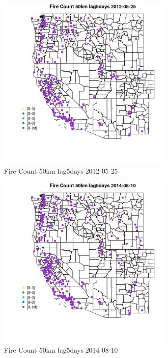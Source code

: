 \begin{figure} 
\centering  
\includegraphics[width=0.77\textwidth]{Code_Outputs/Report_ML_input_PM25_Step4_part_e_de_duplicated_aves_compiled_2019-05-18wNAs_MapObsFire_Count_50km_lag5days2012-05-25.jpg} 
\caption{\label{fig:Report_ML_input_PM25_Step4_part_e_de_duplicated_aves_compiled_2019-05-18wNAsMapObsFire_Count_50km_lag5days2012-05-25}Fire Count 50km lag5days 2012-05-25} 
\end{figure} 
 

\begin{figure} 
\centering  
\includegraphics[width=0.77\textwidth]{Code_Outputs/Report_ML_input_PM25_Step4_part_e_de_duplicated_aves_compiled_2019-05-18wNAs_MapObsFire_Count_50km_lag5days2014-08-10.jpg} 
\caption{\label{fig:Report_ML_input_PM25_Step4_part_e_de_duplicated_aves_compiled_2019-05-18wNAsMapObsFire_Count_50km_lag5days2014-08-10}Fire Count 50km lag5days 2014-08-10} 
\end{figure} 
 

